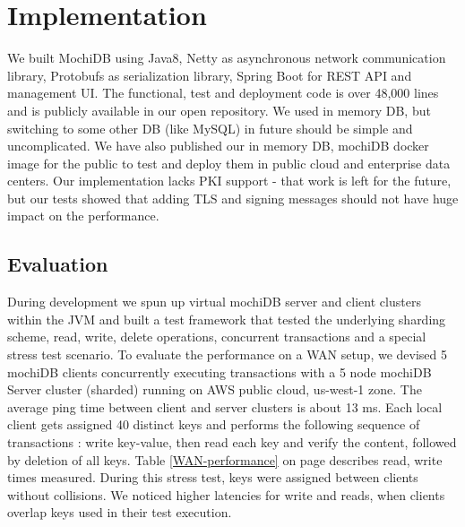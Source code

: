 \documentclass[letterpaper,twocolumn,10pt]{article}
\begin{document}
\section{Implementation}
We built MochiDB using Java8, Netty as asynchronous network communication library, Protobufs as serialization library, Spring Boot for REST API and management UI. The functional, test and deployment code is over 48,000 lines and is publicly available in our open repository\cite{Repository}. We used in memory DB, but switching to some other DB (like MySQL) in future should be simple and uncomplicated. We have also published our in memory DB, mochiDB docker image \cite{DockerHub} for the public to test and deploy them in public cloud and enterprise data centers. Our implementation lacks PKI support - that work is left for the future, but our tests showed that adding TLS and signing messages should not have huge impact on the performance.  

\subsection{Evaluation}
During development we spun up virtual mochiDB server and client clusters within the JVM and built a test framework that tested the underlying sharding scheme, read, write, delete operations, concurrent transactions and a special stress test scenario. To evaluate the performance on a WAN setup, we devised 5 mochiDB clients concurrently executing transactions with a 5 node mochiDB Server cluster (sharded) running on AWS public cloud, us-west-1 zone. The average ping time between client and server clusters is about 13 ms. Each local client gets assigned 40 distinct keys and performs the following sequence of transactions : write key-value, then read each key and verify the content, followed by deletion of all keys. Table \ref{WAN-performance} on page \pageref{WAN-performance} describes read, write times measured. During this stress test, keys were assigned between clients without collisions. We noticed higher latencies for write and reads, when clients overlap keys used in their test execution.

\begin{table}[]
\centering
\caption{MochiDB WAN performance}
\label{WAN-performance}
\end{table}
\end{document}
